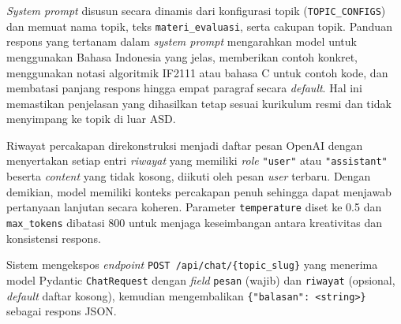 \textit{System prompt} disusun secara dinamis dari konfigurasi topik (\texttt{TOPIC\_CONFIGS}) dan memuat nama topik, teks \texttt{materi\_evaluasi}, serta cakupan topik. Panduan respons yang tertanam dalam \textit{system prompt} mengarahkan model untuk menggunakan Bahasa Indonesia yang jelas, memberikan contoh konkret, menggunakan notasi algoritmik IF2111 atau bahasa C untuk contoh kode, dan membatasi panjang respons hingga empat paragraf secara \textit{default}. Hal ini memastikan penjelasan yang dihasilkan tetap sesuai kurikulum resmi dan tidak menyimpang ke topik di luar ASD.

Riwayat percakapan direkonstruksi menjadi daftar pesan OpenAI dengan menyertakan setiap entri \textit{riwayat} yang memiliki \textit{role} \texttt{"user"} atau \texttt{"assistant"} beserta \textit{content} yang tidak kosong, diikuti oleh pesan \textit{user} terbaru. Dengan demikian, model memiliki konteks percakapan penuh sehingga dapat menjawab pertanyaan lanjutan secara koheren. Parameter \texttt{temperature} diset ke 0.5 dan \texttt{max\_tokens} dibatasi 800 untuk menjaga keseimbangan antara kreativitas dan konsistensi respons.

Sistem mengekspos \textit{endpoint} \texttt{POST /api/chat/\{topic\_slug\}} yang menerima model Pydantic \texttt{ChatRequest} dengan \textit{field} \texttt{pesan} (wajib) dan \texttt{riwayat} (opsional, \textit{default} daftar kosong), kemudian mengembalikan \texttt{\{"balasan": <string>\}} sebagai respons JSON.